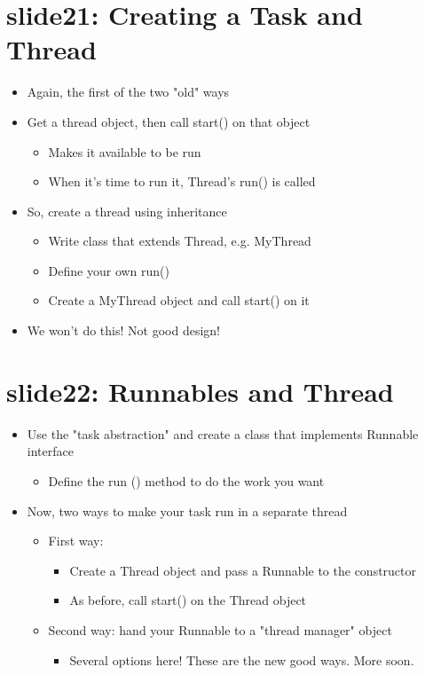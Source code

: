 \documentclass[12pt, a4paper]{book}
\begin{document}
\section{slide21: Creating a Task and Thread}
\begin{itemize}
    \item Again, the first of the two "old" ways
    \item Get a thread object, then call start() on that object
          \begin{itemize}
              \item Makes it available to be run
              \item When it's time to run it, Thread's run() is called
          \end{itemize}
    \item So, create a thread using inheritance
          \begin{itemize}
              \item Write class that extends Thread, e.g. MyThread
              \item Define your own run()
              \item Create a MyThread object and call start() on it
          \end{itemize}
    \item We won't do this! Not good design!
\end{itemize}
\section{slide22: Runnables and Thread}
\begin{itemize}
    \item  Use the "task abstraction" and create a class that implements Runnable interface
          \begin{itemize}
              \item Define the run () method to do the work you want
          \end{itemize}
    \item  Now, two ways to make your task run in a separate thread
          \begin{itemize}
              \item First way:
                    \begin{itemize}
                        \item Create a Thread object and pass a Runnable to the constructor
                        \item As before, call start() on the Thread object
                    \end{itemize}
              \item Second way: hand your Runnable to a "thread manager" object
                    \begin{itemize}
                        \item Several options here! These are the new good ways. More soon.
                    \end{itemize}
          \end{itemize}
\end{itemize}
\end{document}
